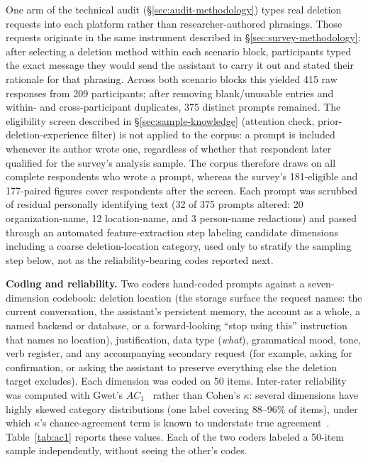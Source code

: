 \documentclass[conference,compsoc]{IEEEtran}
\begin{document}
One arm of the technical audit (\S\ref{sec:audit-methodology}) types real
deletion requests into each platform rather than researcher-authored
phrasings. Those requests originate in the same instrument described in
\S\ref{sec:survey-methodology}: after selecting a deletion method within
each scenario block, participants typed the exact message they would send
the assistant to carry it out and stated their rationale for that
phrasing. Across both scenario blocks this yielded 415 raw responses from
209 participants; after removing blank/unusable entries and within- and
cross-participant duplicates, 375 distinct prompts remained. The
eligibility screen described in \S\ref{sec:sample-knowledge} (attention
check, prior-deletion-experience filter) is not applied to the corpus: a
prompt is included whenever its author wrote one, regardless of whether that
respondent later qualified for the survey's analysis sample. The corpus
therefore draws on all complete respondents who wrote a prompt, whereas the
survey's 181-eligible and 177-paired figures cover respondents after the
screen. Each prompt was
scrubbed of residual personally identifying text (32 of 375 prompts
altered: 20 organization-name, 12 location-name, and 3 person-name
redactions) and passed through an
automated feature-extraction step labeling candidate dimensions including
a coarse deletion-location category, used only to stratify the sampling
step below, not as the reliability-bearing codes reported next.

\textbf{Coding and reliability.} Two coders hand-coded prompts against a
seven-dimension codebook: deletion location (the storage surface the
request names: the current conversation, the assistant's persistent
memory, the account as a whole, a named backend or database, or a
forward-looking ``stop using this'' instruction that names no location),
justification, data type (\emph{what}), grammatical mood, tone, verb
register, and any accompanying secondary request (for example, asking for
confirmation, or asking the assistant to preserve everything else the
deletion target excludes). Each dimension was coded on 50 items.
Inter-rater reliability was computed with Gwet's $AC_1$~\cite{gwet2008ac1}
rather than Cohen's $\kappa$: several dimensions have highly skewed
category distributions (one label covering 88--96\% of items), under which
$\kappa$'s chance-agreement term is known to understate true
agreement~\cite{gwet2008ac1,wongpakaran2013comparison}.
Table~\ref{tab:ac1} reports these values. Each of the two coders labeled a
50-item sample independently, without seeing the other's codes.
\end{document}
